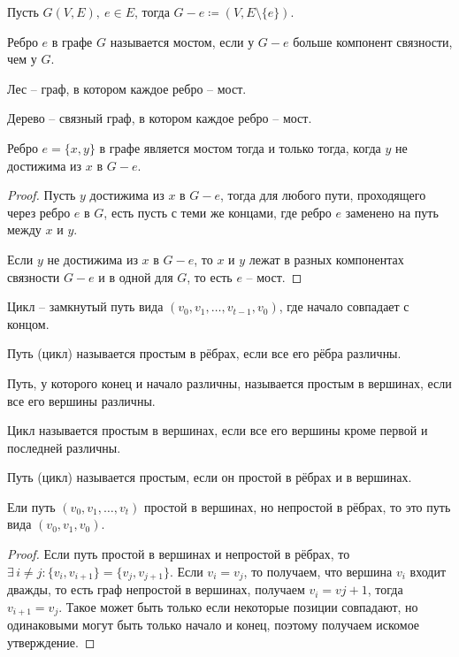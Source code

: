 \documentclass[12pt]{article}
\begin{document}
\begin{definition}
	Пусть $G(V, E),\ e\in E$, тогда $G-e\coloneq(V, E\setminus\{e\})$.
\end{definition}
\begin{definition}
	Ребро $e$ в графе $G$ называется мостом, если у $G-e$ больше
	компонент связности, чем у $G$.
\end{definition}
\begin{definition}
	Лес -- граф, в котором каждое ребро -- мост.
\end{definition}
\begin{definition}
	Дерево -- связный граф, в котором каждое ребро -- мост.
\end{definition}
\begin{lemma}\label{Убрать мост значит добавить компоненту связности}
	Ребро $e=\{x,y\}$ в графе является мостом тогда и только тогда,
	когда $y$ не достижима из $x$ в $G-e$.
	\begin{proof}
		Пусть $y$ достижима из $x$ в $G-e$, тогда для любого пути,
		проходящего через ребро $e$ в $G$, есть пусть с теми же концами,
		где ребро $e$ заменено на путь между $x$ и $y$.\par

		Если $y$ не достижима из $x$ в $G-e$, то $x$ и $y$ лежат в разных
		компонентах связности $G-e$ и в одной для $G$, то есть $e$ -- мост.
	\end{proof}
\end{lemma}
\begin{definition}
	Цикл -- замкнутый путь вида $(v_0, v_1, \ldots,v_{t-1}, v_0)$, где
	начало совпадает с концом.
\end{definition}
\begin{definition}
	Путь (цикл) называется простым в рёбрах, если все его рёбра различны.
\end{definition}
\begin{definition}
	Путь, у которого конец и начало различны, называется простым в
	вершинах, если все его вершины различны.
\end{definition}
\begin{definition}
	Цикл называется простым в вершинах, если все его вершины кроме
	первой и последней различны.
\end{definition}
\begin{definition}
	Путь (цикл) называется простым, если он простой в рёбрах и в вершинах.
\end{definition}
\begin{statement}
	Ели путь $(v_0, v_1,\ldots,v_t)$ простой в вершинах, но непростой в
	рёбрах, то это путь вида $(v_0, v_1, v_0)$.
	\begin{proof}
		Если путь простой в вершинах и непростой в рёбрах, то
		$\exists\,i\neq j\colon \{v_i, v_{i+1}\}=\{v_j, v_{j+1}\}$. Если
		$v_i=v_j$, то получаем, что вершина $v_i$ входит дважды, то есть
		граф непростой в вершинах, получаем $v_i=v{j+1}$, тогда $v_{i+1}=v_j$.
		Такое может быть только если некоторые позиции совпадают, но
		одинаковыми могут быть только начало и конец, поэтому получаем
		искомое утверждение.
	\end{proof}
\end{statement}
\end{document}

